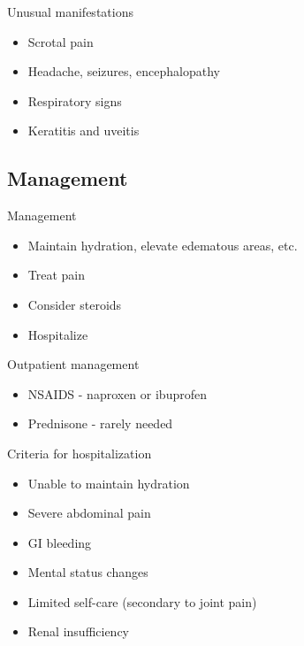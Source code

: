 \begin{frame}{Unusual manifestations}

\begin{itemize}
\itemsep1pt\parskip0pt
\item
  Scrotal pain
\item
  Headache, seizures, encephalopathy
\item
  Respiratory signs
\item
  Keratitis and uveitis
\end{itemize}

\end{frame}

\subsection{Management}\label{management}

\begin{frame}{Management}

\begin{itemize}
\itemsep1pt\parskip0pt
\item
  Maintain hydration, elevate edematous areas, etc.
\item
  Treat pain
\item
  Consider steroids
\item
  Hospitalize
\end{itemize}

\end{frame}

\begin{frame}{Outpatient management}

\begin{itemize}
\itemsep1pt\parskip0pt
\item
  NSAIDS - naproxen or ibuprofen
\item
  Prednisone - rarely needed
\end{itemize}

\end{frame}

\begin{frame}{Criteria for hospitalization}

\begin{itemize}
\itemsep1pt\parskip0pt
\item
  Unable to maintain hydration
\item
  Severe abdominal pain
\item
  GI bleeding
\item
  Mental status changes
\item
  Limited self-care (secondary to joint pain)
\item
  Renal insufficiency
\end{itemize}

\end{frame}


